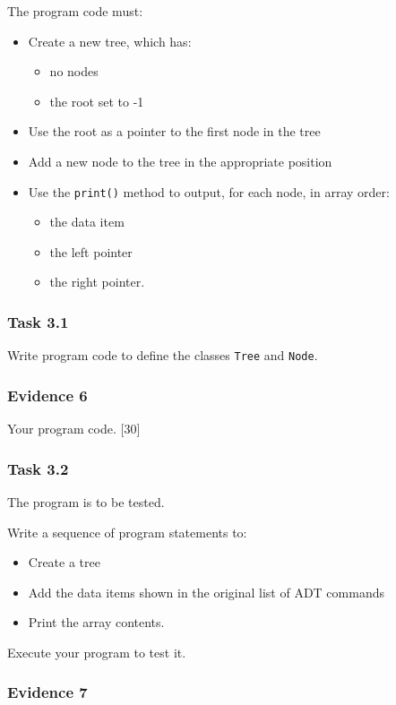 The program code must:
\begin{itemize}
\item Create a new tree, which has: 
\begin{itemize}
\item no nodes 
\item the root set to -1 
\end{itemize}
\item Use the root as a pointer to the first node in the tree 
\item Add a new node to the tree in the appropriate position 
\item Use the \texttt{print()} method to output, for each node, in array
order: 
\begin{itemize}
\item the data item 
\item the left pointer 
\item the right pointer. 
\end{itemize}
\end{itemize}

\subsubsection*{Task 3.1}

Write program code to define the classes \texttt{Tree} and \texttt{Node}. 

\subsubsection*{Evidence 6}

Your program code. \hfill{}{[}30{]}

\subsubsection*{Task 3.2}

The program is to be tested. 

Write a sequence of program statements to: 
\begin{itemize}
\item Create a tree 
\item Add the data items shown in the original list of ADT commands 
\item Print the array contents. 
\end{itemize}
Execute your program to test it. 

\subsubsection*{Evidence 7}

